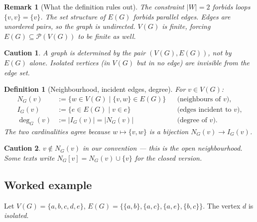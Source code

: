 \documentclass[11pt]{article}
\theoremstyle{defstyle}
\newtheorem{definition}{Definition}[section]
\theoremstyle{thmstyle}
\theoremstyle{notstyle}
\newtheorem*{remark}{Remark}
\theoremstyle{cautionstyle}
\newtheorem*{caution}{Caution}
\newcommand{\card}[1]{\lvert #1 \rvert}
\newcommand{\Pow}{\mathcal{P}}
\begin{document}
\begin{notebox}
\begin{remark}[What the definition rules out]
The constraint $\card{W} = 2$ forbids loops $\{v, v\} = \{v\}$.
The set structure of $E(G)$ forbids parallel edges.  Edges are
\emph{unordered} pairs, so the graph is undirected.  $V(G)$ is finite,
forcing $E(G) \subseteq \Pow(V(G))$ to be finite as well.
\end{remark}
\end{notebox}

\begin{cautionbox}
\begin{caution}
A graph is determined by the \emph{pair} $(V(G), E(G))$, not by $E(G)$
alone.  Isolated vertices (in $V(G)$ but in no edge) are invisible from
the edge set.
\end{caution}
\end{cautionbox}

\begin{defbox}
\begin{definition}[Neighbourhood, incident edges, degree]
For $v \in V(G)$:
\begin{align*}
  N_G(v) &:= \{w \in V(G) \mid \{v, w\} \in E(G)\}
           &&\text{(neighbours of $v$),} \\
  I_G(v) &:= \{e \in E(G) \mid v \in e\}
           &&\text{(edges incident to $v$),} \\
  \deg_G(v) &:= \card{I_G(v)} = \card{N_G(v)}
           &&\text{(degree of $v$).}
\end{align*}
The two cardinalities agree because $w \mapsto \{v, w\}$ is a bijection
$N_G(v) \to I_G(v)$.
\end{definition}
\end{defbox}

\begin{cautionbox}
\begin{caution}
$v \notin N_G(v)$ in our convention --- this is the \emph{open}
neighbourhood.  Some texts write $N_G[v] = N_G(v) \cup \{v\}$ for the
\emph{closed} version.
\end{caution}
\end{cautionbox}

\subsection{Worked example}

Let $V(G) = \{a, b, c, d, e\}$, $E(G) = \{\{a,b\}, \{a,c\}, \{a,e\}, \{b,c\}\}$.
The vertex $d$ is \emph{isolated}.
\end{document}
